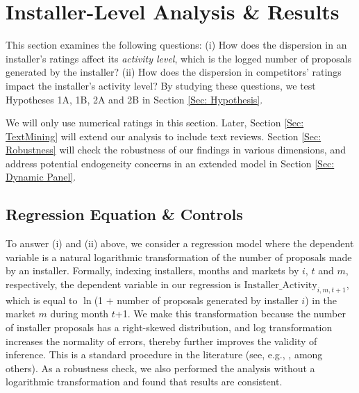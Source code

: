 \documentclass[mnsc,blindrev]{informs3}
\begin{document}
	
	
	
	
	
	\section{Installer-Level Analysis \& Results} \label{Sec: Installer-level}
	
	This section examines the following questions: (i) How does the dispersion in an installer's ratings affect its \emph{activity level}, which is the logged  number of proposals generated by the installer? (ii) How does the dispersion in competitors' ratings impact the installer's activity level? By studying these questions, we test Hypotheses 1A, 1B, 2A and 2B in Section \ref{Sec: Hypothesis}.
	
	
	We will only use numerical ratings in this section. Later, Section \ref{Sec: TextMining}  will extend our analysis to include text reviews. Section \ref{Sec: Robustness} will check the robustness of our findings in various dimensions, and address potential endogeneity concerns in an extended model in Section \ref{Sec: Dynamic Panel}.
	
	\subsection{Regression Equation \& Controls}
	
	To answer (i) and (ii) above, we consider a regression model where the dependent variable is a natural logarithmic transformation of the number of proposals made by an installer. Formally, indexing installers, months and markets by $i$, $t$ and $m$, respectively, the dependent variable in our regression is  $\text{Installer\_Activity}_{i,m,t+1}$, which is equal to $\ln$(1 $+$ number of proposals generated by installer $i$) in the market $m$ during month $t$+1. We make this transformation because the number of installer proposals has a right-skewed distribution, and log transformation increases the normality of errors, thereby further improves the validity of inference. This is a standard procedure in the literature (see, e.g., \citet{song2017closing,tan2014does,tan2019you}, among others). As a robustness check, we also performed the analysis without a logarithmic transformation and found that results are consistent.
	
\end{document}
